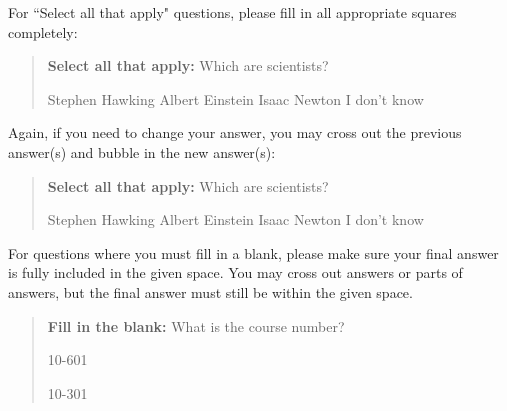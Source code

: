 \documentclass[11pt,addpoints,answers]{exam}
\begin{document}
For ``Select all that apply" questions, please fill in all appropriate squares completely:

\begin{quote}
\textbf{Select all that apply:} Which are scientists?
    {%
    \checkboxchar{$\Box$} \checkedchar{$\blacksquare$} %
    \begin{checkboxes}
    \CorrectChoice Stephen Hawking 
    \CorrectChoice Albert Einstein
    \CorrectChoice Isaac Newton
    \choice I don't know
    \end{checkboxes}
    }
\end{quote}

Again, if you need to change your answer, you may cross out the previous answer(s) and bubble in the new answer(s):

\begin{quote}
\textbf{Select all that apply:} Which are scientists?
    {%
    \checkboxchar{\xcancel{$\blacksquare$}} \checkedchar{$\blacksquare$} %
    \begin{checkboxes}
    \CorrectChoice Stephen Hawking 
    \CorrectChoice Albert Einstein
    \CorrectChoice Isaac Newton
    \choice I don't know
    \end{checkboxes}
    }
\end{quote}

For questions where you must fill in a blank, please make sure your final answer is fully included in the given space. You may cross out answers or parts of answers, but the final answer must still be within the given space.

\begin{quote}
\textbf{Fill in the blank:} What is the course number?

\begin{tcolorbox}[fit,height=1cm, width=4cm, blank, borderline={1pt}{-2pt},nobeforeafter]
    \begin{center}\huge10-601\end{center}
    \end{tcolorbox}\hspace{2cm}
    \begin{tcolorbox}[fit,height=1cm, width=4cm, blank, borderline={1pt}{-2pt},nobeforeafter]
    \begin{center}\huge10-301\end{center}
    \end{tcolorbox}
\end{quote}
\end{document}
